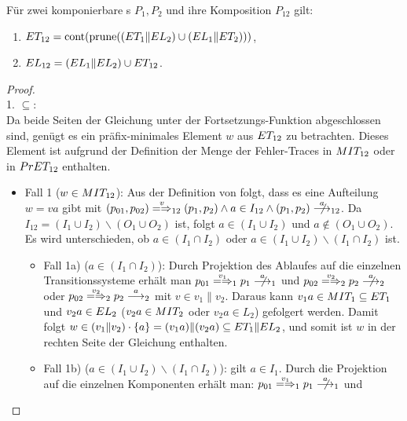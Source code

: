 \begin{Satz}
  \label{KommFehlerSemSatz}
  Für zwei komponierbare \MEIO{}s $P_1,P_2$ und ihre Komposition $P_{12}$ gilt:
  \begin{enumerate}
    \item $ET _{12} = \mathrm{cont} (\mathrm{prune} ((ET _1\|EL _2) \cup (EL _1\|ET
      _2)))$,
    \item $EL _{12} = (EL _1\|EL _2) \cup ET _{12}$.
  \end{enumerate}
\end{Satz}
\begin{proof}\mbox{}\\
  1. \glqq$\subseteq$\grqq{}:\\
  Da beide Seiten der Gleichung unter der Fortsetzungs-Funktion \cont{}
  abgeschlossen sind, genügt es ein präfix-minimales Element $w$ aus $ET
  _{12}$ zu betrachten. Dieses Element ist aufgrund der Definition der Menge der
  Fehler-Traces in $MIT _{12}$ oder in $PrET _{12}$ enthalten.
  \begin{itemize}
    \item Fall 1 ($w\in MIT _{12}$): Aus der Definition von \MIT{} folgt, dass
      es eine Aufteilung $w=va$ gibt mit $(p_{01},p_{02}) \weakmay[v]_{12}
      (p_1,p_2) \land a \in I_{12} \land (p_1,p_2) \nmust[a]_{12}$. Da $I_{12}
      = (I_1\cup I_2) \backslash (O_1\cup O_2)$ ist, folgt $a\in (I_1\cup I_2)$
      und $a\notin (O_1\cup O_2)$. Es wird unterschieden, ob $a\in (I_1\cap
      I_2)$ oder $a\in (I_1\cup I_2) \backslash (I_1\cap I_2)$ ist.
    \begin{itemize}
      \item Fall 1a) ($a\in (I_1\cap I_2)$): Durch Projektion des Ablaufes auf
        die einzelnen Transitionssysteme erhält man \oBdA{}
        $p_{01}\weakmay[v_1]_1 p_1\nmust[a]_1$ und $p_{02}\weakmay[v_2]_2
        p_2\nmust[a]_2$ oder $p_{02}\weakmay[v_2]_2 p_2\must[a]_2$ mit $v\in
        v_1\|v_2$. Daraus kann $v_1a\in MIT _1 \subseteq ET _1$ und
        $v_2a\in EL _2$ ($v_2a\in MIT _2$ oder $v_2a \in L_2$) gefolgert
        werden. Damit folgt $w\in (v_1\|v_2) \cdot \{a\} =
        (v_1a)\|(v_2a)\subseteq ET _1\|EL _2$, und somit ist $w$ in der
        rechten Seite der Gleichung enthalten.
      \item Fall 1b) ($a\in (I_1\cup I_2)\backslash (I_1\cap I_2)$): \OBdA{}
        gilt $a\in I_1$. Durch die Projektion auf die einzelnen Komponenten
        erhält man: $p_{01}\weakmay[v_1]_1 p_1\nmust[a]_1$ und

\end{itemize}
\end{itemize}
\end{proof}
